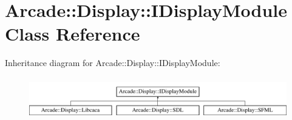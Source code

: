 \hypertarget{classArcade_1_1Display_1_1IDisplayModule}{}\section{Arcade\+::Display\+::I\+Display\+Module Class Reference}
\label{classArcade_1_1Display_1_1IDisplayModule}
Inheritance diagram for Arcade\+::Display\+::I\+Display\+Module\+:\begin{figure}[H]
\begin{center}
\leavevmode
\includegraphics[height=1.839080cm]{classArcade_1_1Display_1_1IDisplayModule}
\end{center}
\end{figure}
